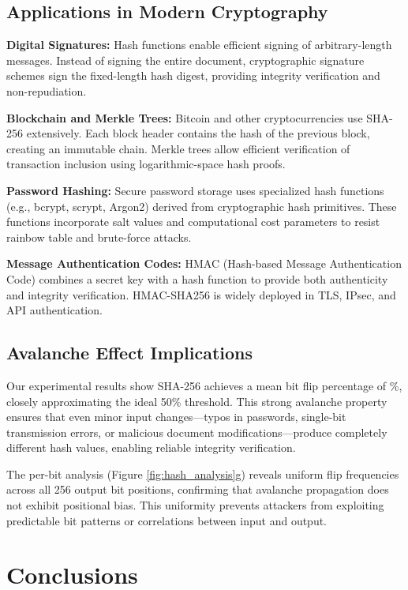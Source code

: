 \documentclass[a4paper, 11pt]{article}
\begin{document}
\subsection{Applications in Modern Cryptography}

\textbf{Digital Signatures:} Hash functions enable efficient signing of arbitrary-length
messages. Instead of signing the entire document, cryptographic signature schemes sign
the fixed-length hash digest, providing integrity verification and non-repudiation.

\textbf{Blockchain and Merkle Trees:} Bitcoin and other cryptocurrencies use SHA-256
extensively. Each block header contains the hash of the previous block, creating an
immutable chain. Merkle trees allow efficient verification of transaction inclusion
using logarithmic-space hash proofs.

\textbf{Password Hashing:} Secure password storage uses specialized hash functions
(e.g., bcrypt, scrypt, Argon2) derived from cryptographic hash primitives. These
functions incorporate salt values and computational cost parameters to resist
rainbow table and brute-force attacks.

\textbf{Message Authentication Codes:} HMAC (Hash-based Message Authentication Code)
combines a secret key with a hash function to provide both authenticity and integrity
verification. HMAC-SHA256 is widely deployed in TLS, IPsec, and API authentication.

\subsection{Avalanche Effect Implications}

Our experimental results show SHA-256 achieves a mean bit flip percentage of
\%, closely approximating the ideal 50\% threshold.
This strong avalanche property ensures that even minor input changes—typos in passwords,
single-bit transmission errors, or malicious document modifications—produce completely
different hash values, enabling reliable integrity verification.

The per-bit analysis (Figure \ref{fig:hash_analysis}g) reveals uniform flip frequencies
across all 256 output bit positions, confirming that avalanche propagation does not
exhibit positional bias. This uniformity prevents attackers from exploiting predictable
bit patterns or correlations between input and output.

\section{Conclusions}
\end{document}
